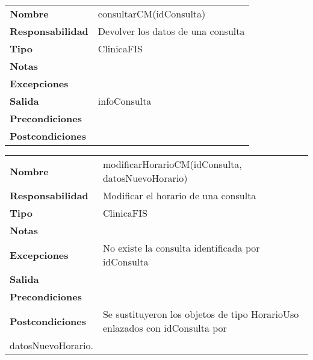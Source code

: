 \begin{table}[htbp]
	  \begin{tabularx}{\textwidth}{l|l}
    \textbf{Nombre}        &  consultarCM(idConsulta) \\ 
    \textbf{Responsabilidad}  & Devolver los datos de una consulta \\ 
    \textbf{Tipo}        &  ClinicaFIS\\ 
    \textbf{Notas}        & \\ 
    \textbf{Excepciones}    &  \\ 
    \textbf{Salida}        & infoConsulta \\ 
    \textbf{Precondiciones}    &  \\ 
    \textbf{Postcondiciones}  &  \\ 
  \end{tabularx}

\end{table}


\begin{table}[htbp]
	  \begin{tabularx}{\textwidth}{l|l}
    \textbf{Nombre}        & modificarHorarioCM(idConsulta, datosNuevoHorario) \\ 
    \textbf{Responsabilidad}  & Modificar el horario de una consulta \\ 
    \textbf{Tipo}        & ClinicaFIS \\ 
    \textbf{Notas}        &  \\ 
    \textbf{Excepciones}    & No existe la consulta identificada por idConsulta \\ 
    \textbf{Salida}        &  \\ 
    \textbf{Precondiciones}    &  \\ 
    \textbf{Postcondiciones}  &  Se sustituyeron los objetos de tipo HorarioUso enlazados con idConsulta por\\ datosNuevoHorario. \\ 
  \end{tabularx}

\end{table}




